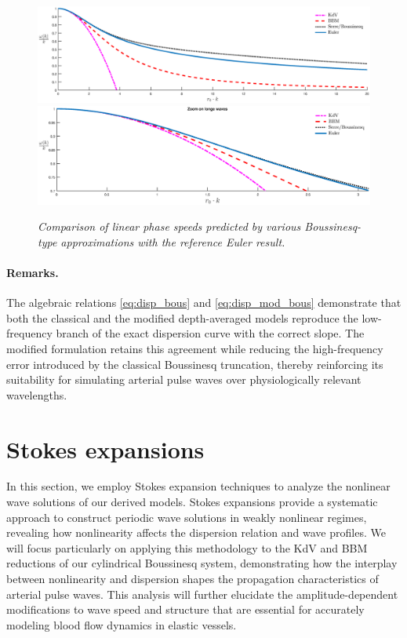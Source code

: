 \documentclass[alpha-refs, 12pt]{wiley-article}
\begin{document}
\begin{figure}[t]
  \centering
  \includegraphics[width=\textwidth]{figs/disp1.eps}
  \includegraphics[width=\textwidth]{figs/disp4.eps}
  \caption{\em Comparison of linear phase speeds predicted by various Boussinesq-type approximations with the reference Euler result.}
  \label{fig:disp}
\end{figure}

\paragraph{Remarks.} The algebraic relations \eqref{eq:disp_bous} and \eqref{eq:disp_mod_bous} demonstrate that both the classical and the modified depth-averaged models reproduce the low-frequency branch of the exact dispersion curve with the correct slope.  The modified formulation retains this agreement while reducing the high-frequency error introduced by the classical Boussinesq truncation, thereby reinforcing its suitability for simulating arterial pulse waves over physiologically relevant wavelengths.

\section{Stokes expansions}

In this section, we employ Stokes expansion techniques to analyze the nonlinear wave solutions of our derived models. Stokes expansions provide a systematic approach to construct periodic wave solutions in weakly nonlinear regimes, revealing how nonlinearity affects the dispersion relation and wave profiles. We will focus particularly on applying this methodology to the KdV and BBM reductions of our cylindrical Boussinesq system, demonstrating how the interplay between nonlinearity and dispersion shapes the propagation characteristics of arterial pulse waves. This analysis will further elucidate the amplitude-dependent modifications to wave speed and structure that are essential for accurately modeling blood flow dynamics in elastic vessels.
\end{document}
